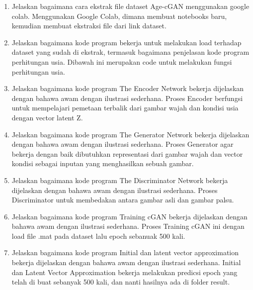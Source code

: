     \begin{enumerate}
		\item Jelaskan bagaimana cara ekstrak ﬁle dataset Age-cGAN menggunakan google colab.
		Menggunakan Google Colab, dimana membuat notebooks baru, kemudian membuat ekstraksi file dari link dataset.
		

		\item Jelaskan bagaimana kode program bekerja untuk melakukan load terhadap dataset yang sudah di ekstrak, termasuk bagaimana penjelasan kode program perhitungan usia.
		Dibawah ini merupakan code untuk melakukan fungsi perhitungan usia.
		

		\item Jelaskan bagaimana kode program The Encoder Network bekerja dijelaskan dengan bahawa awam dengan ilustrasi sederhana.
		Proses Encoder berfungsi untuk mempelajari pemetaan terbalik dari gambar wajah dan kondisi usia dengan vector latent Z.
		

		\item Jelaskan bagaimana kode program The Generator Network bekerja dijelaskan dengan bahawa awam dengan ilustrasi sederhana.
		Proses Generator agar bekerja dengan baik dibutuhkan representasi dari gambar wajah dan vector kondisi sebagai inputan yang menghasilkan sebuah gambar.
		

		\item Jelaskan bagaimana kode program The Discriminator Network bekerja dijelaskan dengan bahawa awam dengan ilustrasi sederhana.
		Proses Discriminator untuk membedakan antara gambar asli dan gambar palsu.
		

		\item Jelaskan bagaimana kode program Training cGAN bekerja dijelaskan dengan bahawa awam dengan ilustrasi sederhana.
		Proses Training cGAN ini dengan load file .mat pada dataset lalu epoch sebanuak 500 kali.

		

		\item Jelaskan bagaimana kode program Initial dan latent vector approximation bekerja dijelaskan dengan bahawa awam dengan ilustrasi sederhana.
		Initial dan Latent Vector Approximation bekerja melakukan predicsi epoch yang telah di buat sebanyak 500 kali, dan nanti hasilnya ada di folder result.

		

\end{enumerate}

